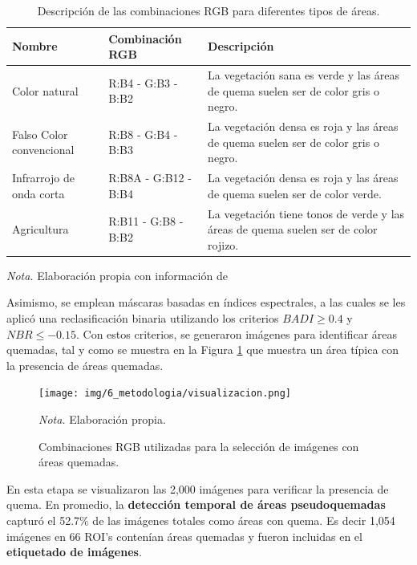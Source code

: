 \begin{table}[H]
    \centering
    \caption{Descripción de las combinaciones RGB para diferentes tipos de áreas.}
    \label{tab:combinaciones}
    \begin{tabularx}{\textwidth}{XXX}
        \hline
        \textbf{Nombre} & \textbf{Combinación RGB} & \textbf{Descripción}\\
        \hline
        Color natural & R:B4 - G:B3 - B:B2 & La vegetación sana es verde y las áreas de quema suelen ser de color gris o negro. \\
        Falso Color convencional & R:B8 - G:B4 - B:B3 & La vegetación densa es roja y las áreas de quema suelen ser de color gris o negro. \\
        Infrarrojo de onda corta & R:B8A - G:B12 - B:B4 & La vegetación densa es roja y las áreas de quema suelen ser de color verde. \\
        Agricultura & R:B11 - G:B8 - B:B2 & La vegetación tiene tonos de verde y las áreas de quema suelen ser de color rojizo. \\
        \hline
    \end{tabularx}
    \begin{flushleft}
        \textit{Nota.} Elaboración propia con información de \citet{Sentinel-Hub}        
        \vspace{-\baselineskip}
    \end{flushleft}
\end{table}


Asimismo, se emplean máscaras basadas en índices espectrales, a las cuales se les aplicó una reclasificación binaria utilizando los criterios 
$BADI \geq 0.4$ y $NBR \leq -0.15$. Con estos criterios, se generaron imágenes para identificar áreas quemadas, tal y como se muestra en la Figura \ref{fig:visualizacion} 
que muestra un área típica con la presencia de áreas quemadas.

\begin{figure}[H]
    \centering
    \caption{Combinaciones RGB utilizadas para la selección de imágenes con áreas quemadas.}
    \texttt{[image: img/6\_metodologia/visualizacion.png]}
    \label{fig:visualizacion}
    \begin{flushleft}
        \textit{Nota.} Elaboración propia.        
        \vspace{-\baselineskip}
    \end{flushleft}
\end{figure}

En esta etapa se visualizaron las 2,000 imágenes para verificar la presencia de quema. En promedio, la \textbf{detección temporal de áreas pseudoquemadas} capturó el 52.7\% de las imágenes totales como áreas con quema. 
Es decir 1,054 imágenes en 66 ROI's contenían áreas quemadas y fueron incluidas en el \textbf{etiquetado de imágenes}. 

